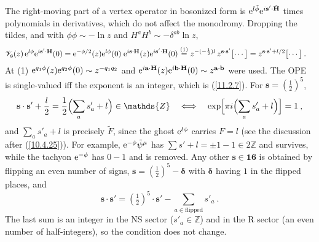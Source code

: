 \begin{tcolorbox}[breakable]
	\begin{remark}
		The right-moving part of a vertex operator in bosonized form is $\mathrm{e}^{l\tilde{\phi}}\mathrm{e}^{i\mathbf{s}'\cdot\tilde{\mathbf{H}}}$ times polynomials in derivatives, which do not affect the monodromy. Dropping the tildes, and with $\phi\phi\sim-\ln z$ and $H^{a}H^{b}\sim-\delta^{ab}\ln z$,
		\begin{align*}
			\mathscr{V}_{\mathbf{s}}(z)\,\mathrm{e}^{l\phi}\mathrm{e}^{i\mathbf{s}'\cdot\mathbf{H}}(0)
			&=\mathrm{e}^{-\phi/2}(z)\mathrm{e}^{l\phi}(0)\;\mathrm{e}^{i\mathbf{s}\cdot\mathbf{H}}(z)\mathrm{e}^{i\mathbf{s}'\cdot\mathbf{H}}(0)
			\overset{(1)}{=} z^{-(-\frac{1}{2})l}\,z^{\mathbf{s}\cdot\mathbf{s}'}\bigl[\cdots\bigr]
			= z^{\mathbf{s}\cdot\mathbf{s}'+l/2}\bigl[\cdots\bigr]\:.
		\end{align*}
		At (1) $\mathrm{e}^{q_{1}\phi}(z)\mathrm{e}^{q_{2}\phi}(0)\sim z^{-q_{1}q_{2}}$ and $\mathrm{e}^{i\mathbf{a}\cdot\mathbf{H}}(z)\mathrm{e}^{i\mathbf{b}\cdot\mathbf{H}}(0)\sim z^{\mathbf{a}\cdot\mathbf{b}}$ were used. The OPE is single-valued iff the exponent is an integer, which is (\ref{11.2.7}). For $\mathbf{s}=(\frac{1}{2})^{5}$,
		\begin{equation*}
			\mathbf{s}\cdot\mathbf{s}'+\frac{l}{2}=\frac{1}{2}\Bigl(\sum_{a}s'_{a}+l\Bigr)\in\mathds{Z}
			\quad\Longleftrightarrow\quad \exp\Bigl[\pi\mi\Bigl(\sum_{a}s'_{a}+l\Bigr)\Bigr]=1\:,
		\end{equation*}
		and $\sum_{a}s'_{a}+l$ is precisely $\tilde{F}$, since the ghost $\mathrm{e}^{l\phi}$ carries $F=l$ (see the discussion after (\ref{10.4.25})). For example, $\mathrm{e}^{-\phi}\tilde{\psi}^{\mu}$ has $\sum s'+l=\pm1-1\in 2\mathds{Z}$ and survives, while the tachyon $\mathrm{e}^{-\phi}$ has $0-1$ and is removed. Any other $\mathbf{s}\in\mathbf{16}$ is obtained by flipping an even number of signs, $\mathbf{s}=(\tfrac{1}{2})^{5}-\boldsymbol{\delta}$ with $\boldsymbol{\delta}$ having $1$ in the flipped places, and
		\begin{equation*}
			\mathbf{s}\cdot\mathbf{s}'=(\tfrac{1}{2})^{5}\cdot\mathbf{s}'-\sum_{a\in\text{flipped}}s'_{a}\:.
		\end{equation*}
		The last sum is an integer in the NS sector ($s'_{a}\in\mathds{Z}$) and in the R sector (an even number of half-integers), so the condition does not change.
	\end{remark}
\end{tcolorbox}

